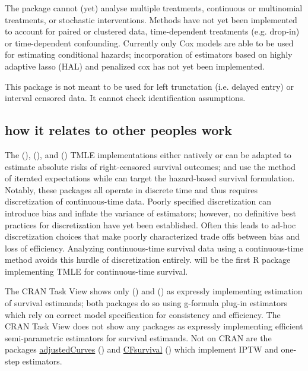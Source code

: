 \documentclass{report}
\newcommand{\1}{\ensuremath{\mathbf{1}}}
\begin{document}
The package cannot (yet) analyse multiple treatments, continuous or multinomial treatments, or stochastic interventions. Methods have not yet been implemented to account for paired or clustered data, time-dependent treatments (e.g. drop-in) or time-dependent confounding. Currently only Cox models are able to be used for estimating conditional hazards; incorporation of estimators based on highly adaptive lasso (HAL) and penalized cox has not yet been implemented.

This package is not meant to be used for left trunctation (i.e. delayed entry) or interval censored data. It cannot check identification assumptions. 

\subsection{how it relates to other peoples work}
\label{sec:org1f45db5}

The  (\cite{schwab_ltmle_2020}),  (\cite{sofrygin_stremr_2017}), and  (\cite{benkeser_survtmle_2019}) TMLE implementations either natively or can be adapted to estimate absolute risks of right-censored survival outcomes;  and  use the method of iterated expectations while  can target the hazard-based survival formulation. Notably, these packages all operate in discrete time and thus requires discretization of continuous-time data. Poorly specified discretization can introduce bias and inflate the variance of estimators; however, no definitive best practices for discretization have yet been established. Often this leads to ad-hoc discretization choices that make poorly characterized trade offs between bias and loss of efficiency. Analyzing continuous-time survival data using a continuous-time method avoids this hurdle of discretization entirely.  will be the first R package implementing TMLE for continuous-time survival.

The  CRAN Task View shows only  (\cite{gerds_riskregression_2022}) and  (\cite{wallace_dtrreg_2020}) as expressly implementing estimation of survival estimands; both packages do so using g-formula plug-in estimators which rely on correct model specification for consistency and efficiency. The  CRAN Task View does not show any packages as expressly implementing efficient semi-parametric estimators for survival estimands. Not on CRAN are the packages \href{https://github.com/RobinDenz1/adjustedCurves}{adjustedCurves} (\cite{denz_comparison_2022}) and \href{https://github.com/tedwestling/CFsurvival}{CFsurvival} (\cite{westling_inference_2021}) which implement IPTW and one-step estimators. 
\end{document}
